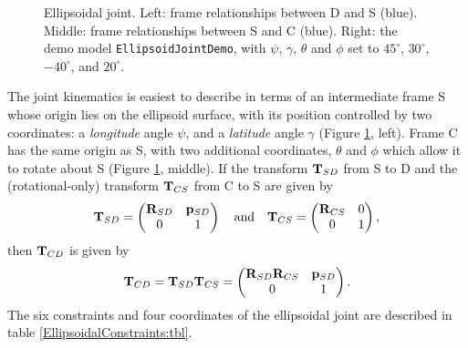 \begin{figure}[h]
\begin{center}
\end{center}
\caption{Ellipsoidal joint. Left: frame relationships between
D and S (blue). Middle: frame relationships between S and C (blue).
Right: the demo model {\tt EllipsoidJointDemo}, with
$\psi$, $\gamma$, $\theta$ and $\phi$ set to $45^\circ$, $30^\circ$,
$-40^\circ$, and $20^\circ$.}
\label{EllipsoidalJoint:fig}
\end{figure}

The joint kinematics is easiest to describe in terms of an
intermediate frame S whose origin lies on the ellipsoid surface,
with its position controlled by two coordinates: a {\it longitude}
angle $\psi$, and a {\it latitude} angle $\gamma$ (Figure
\ref{EllipsoidalJoint:fig}, left). Frame C has the same origin as
S, with two additional coordinates, $\theta$ and $\phi$ which allow it
to rotate about S (Figure \ref{EllipsoidalJoint:fig}, middle).  If the
transform ${\bf T}_{SD}$ from S to D and the (rotational-only) transform
${\bf T}_{CS}$ from C to S are given by
%
\begin{equation*}
{\bf T}_{SD} = \left(\begin{matrix} {\bf R}_{SD} & {\bf p}_{SD} \\ 0 & 1 \end{matrix}\right)
\quad \text{and} \quad
{\bf T}_{CS} = \left(\begin{matrix} {\bf R}_{CS} & 0 \\ 0 & 1 \end{matrix}\right),
\end{equation*}
%
then ${\bf T}_{CD}$ is given by
%
\begin{equation*}
{\bf T}_{CD} = {\bf T}_{SD} {\bf T}_{CS} =
\left(\begin{matrix} {\bf R}_{SD} {\bf R}_{CS} & {\bf p}_{SD} \\ 0 & 1 \end{matrix}\right).
\end{equation*}
%
The six constraints and four coordinates of the ellipsoidal joint are
described in table \ref{EllipsoidalConstraints:tbl}.

